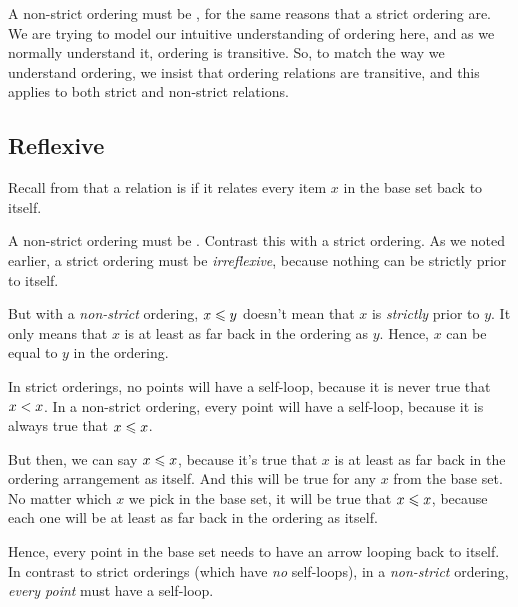 \documentclass[../../../main.tex]{subfiles}
\begin{document}
A non-strict ordering must be , for the same reasons that a strict ordering are. We are trying to model our intuitive understanding of ordering here, and as we normally understand it, ordering is transitive. So, to match the way we understand ordering, we insist that ordering relations are transitive, and this applies to both strict and non-strict relations.


\subsection{Reflexive}

\begin{aside}
  \begin{remark}
    Recall from  that a relation is  if it relates every item $x$ in the base set back to itself.
  \end{remark}
\end{aside}

A non-strict ordering must be . Contrast this with a strict ordering. As we noted earlier, a strict ordering must be \emph{irreflexive}, because nothing can be strictly prior to itself. 

But with a \emph{non-strict} ordering, $x \order/ y$ doesn't mean that $x$ is \emph{strictly} prior to $y$. It only means that $x$ is at least as far back in the ordering as $y$. Hence, $x$ can be equal to $y$ in the ordering.

\begin{aside}
  \begin{remark}
    In strict orderings, no points will have a self-loop, because it is never true that $x \strictorder/ x$. In a non-strict ordering, every point will have a self-loop, because it is always true that $x \order/ x$.
  \end{remark}
\end{aside}

But then, we can say $x \order/ x$, because it's true that $x$ is at least as far back in the ordering arrangement as itself. And this will be true for any $x$ from the base set. No matter which $x$ we pick in the base set, it will be true that $x \order/ x$, because each one will be at least as far back in the ordering as itself. 

Hence, every point in the base set needs to have an arrow looping back to itself. In contrast to strict orderings (which have \emph{no} self-loops), in a \emph{non-strict} ordering, \emph{every point} must have a self-loop.
\end{document}
